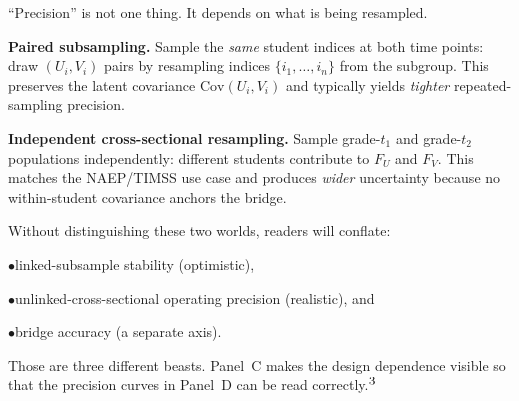 \documentclass[10pt]{article}
\begin{document}
\noindent
\begin{minipage}[t]{3.75in}
  \vspace{0.05in}
  \hspace{0.15in}%
  \begin{minipage}{3.45in}
    \small\raggedright\color{bodyGrey}

    ``Precision'' is not one thing. It depends on what is being resampled.

    \vspace{4pt}
    \textcolor{pairedTeal}{\bfseries Paired subsampling.}
    Sample the \emph{same} student indices at both time points: draw
    $(U_i, V_i)$ pairs by resampling indices $\{i_1, \ldots, i_n\}$ from
    the subgroup. This preserves the latent covariance
    $\mathrm{Cov}(U_i, V_i)$ and typically yields \emph{tighter}
    repeated-sampling precision.

    \vspace{4pt}
    \textcolor{indepRed}{\bfseries Independent cross-sectional resampling.}
    Sample grade-$t_1$ and grade-$t_2$ populations independently: different
    students contribute to $F_U$ and $F_V$. This matches the
    NAEP/TIMSS use case and produces \emph{wider} uncertainty because no
    within-student covariance anchors the bridge.

    \vspace{4pt}
    Without distinguishing these two worlds, readers will conflate:

    \vspace{2pt}
    \hspace{5pt}$\bullet$\;linked-subsample stability (optimistic),

    \vspace{1pt}
    \hspace{5pt}$\bullet$\;unlinked-cross-sectional operating precision
              (realistic), and

    \vspace{1pt}
    \hspace{5pt}$\bullet$\;bridge accuracy (a separate axis).

    \vspace{4pt}
    Those are three different beasts. Panel~C makes the design dependence
    visible so that the precision curves in Panel~D can be read correctly.$^{\mbox{\footnotesize{3}}}$

  \end{minipage}
  \vspace{0.1in}
\end{minipage}
\end{document}

